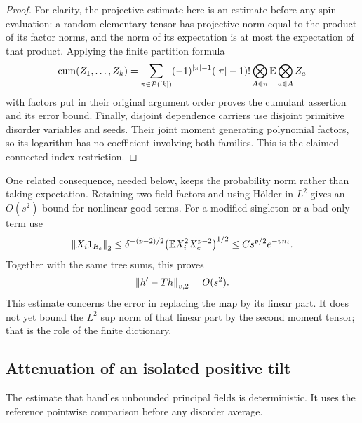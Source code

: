 \begin{proof}
For clarity, the projective estimate here is an estimate before any
spin evaluation: a random elementary tensor has projective norm equal
to the product of its factor norms, and the norm of its expectation is
at most the expectation of that product.  Applying the finite partition
formula
\[
 \operatorname{cum}(Z_1,\ldots,Z_k)
 =\sum_{\pi\in\mathcal P([k])}(-1)^{|\pi|-1}(|\pi|-1)!
       \bigotimes_{A\in\pi}\mathbb E\bigotimes_{a\in A}Z_a
\]
with factors put in their original argument order proves the cumulant
assertion and its error bound.  Finally, disjoint dependence carriers
use disjoint primitive disorder variables and seeds.  Their joint moment
generating polynomial factors, so its logarithm has no coefficient
involving both families.  This is the claimed connected-index restriction.
\end{proof}

One related consequence, needed below, keeps the probability norm rather
than taking expectation.  Retaining two field factors and using
H\"older in $L^2$ gives an $O(s^2)$ bound for nonlinear good terms.
For a modified singleton or a bad-only term use
\[
 \left\lVert X_i\mathbf 1_{\mathcal B_c}\right\rVert_2
 \le \delta^{-(p-2)/2}
      \big(\mathbb E X_i^2X_c^{p-2}\big)^{1/2}
 \le C s^{p/2}e^{-v n_i}.
\]
Together with the same tree sums, this proves
\begin{equation}\label{norm:quadratic-L2}
                  \left\lVert h'-Th\right\rVert_{v,2}=O(s^2).
\end{equation}
This estimate concerns the error in replacing the map by its linear
part.  It does not yet bound the $L^2$ sup norm of that linear part by
the second moment tensor; that is the role of the finite dictionary.

\subsection{Attenuation of an isolated positive tilt}
The estimate that handles unbounded principal fields is deterministic.
It uses the reference pointwise comparison before any disorder average.

